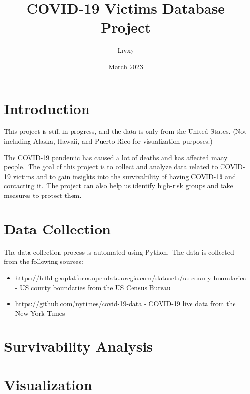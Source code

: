 \documentclass{article}
\begin{document}
\title{COVID-19 Victims Database Project}
\author{Livxy}
\date{March 2023}

\maketitle
\thispagestyle{empty}
\vspace{50cm}
\setlength{\columnsep}{14pt}


\section{Introduction}
\begin{boxH}
	This project is still in progress, and the data is only from the United States. (Not including Alaska, Hawaii, and Puerto Rico for visualization purposes.)
\end{boxH}

\indent

The COVID-19 pandemic has caused a lot of deaths and has affected many people.\
The goal of this project is to collect and analyze data related to COVID-19 victims and to gain insights into the survivability of having COVID-19 and contacting it.\
The project can also help us identify high-risk groups and take measures to protect them.


\section{Data Collection}
\indent

The data collection process is automated using Python.\
The data is collected from the following sources: \
\begin{itemize}
	\item \cite{census} \url{https://hifld-geoplatform.opendata.arcgis.com/datasets/us-county-boundaries} - US county boundaries from the US Census Bureau
	\item \cite{nytimes} \url{https://github.com/nytimes/covid-19-data} - COVID-19 live data from the New York Times
\end{itemize}



\section{Survivability Analysis}


\section{Visualization}
\end{document}
